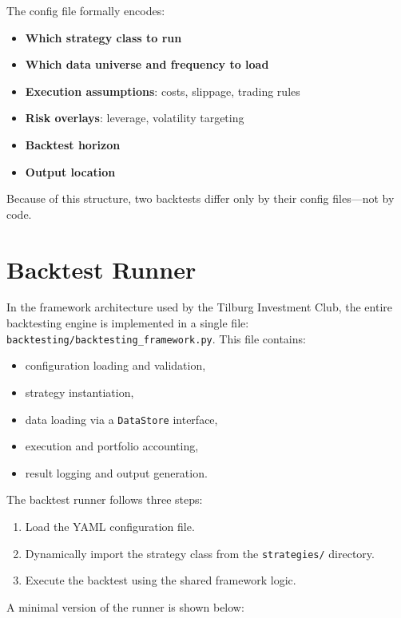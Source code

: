 \documentclass[11pt]{article}
\begin{document}
The config file formally encodes:
\begin{itemize}
    \item \textbf{Which strategy class to run}
    \item \textbf{Which data universe and frequency to load}
    \item \textbf{Execution assumptions}: costs, slippage, trading rules
    \item \textbf{Risk overlays}: leverage, volatility targeting
    \item \textbf{Backtest horizon}
    \item \textbf{Output location}
\end{itemize}

Because of this structure, two backtests differ only by their config files—not by code.

\newpage
\section{Backtest Runner}

In the framework architecture used by the Tilburg Investment Club, 
the entire backtesting engine is implemented in a single file:
\texttt{backtesting/backtesting\_framework.py}. This file contains:

\begin{itemize}
    \item configuration loading and validation,
    \item strategy instantiation,
    \item data loading via a \texttt{DataStore} interface,
    \item execution and portfolio accounting,
    \item result logging and output generation.
\end{itemize}

The backtest runner follows three steps:

\begin{enumerate}
    \item Load the YAML configuration file.
    \item Dynamically import the strategy class from the \texttt{strategies/} directory.
    \item Execute the backtest using the shared framework logic.
\end{enumerate}

A minimal version of the runner is shown below:
\end{document}
